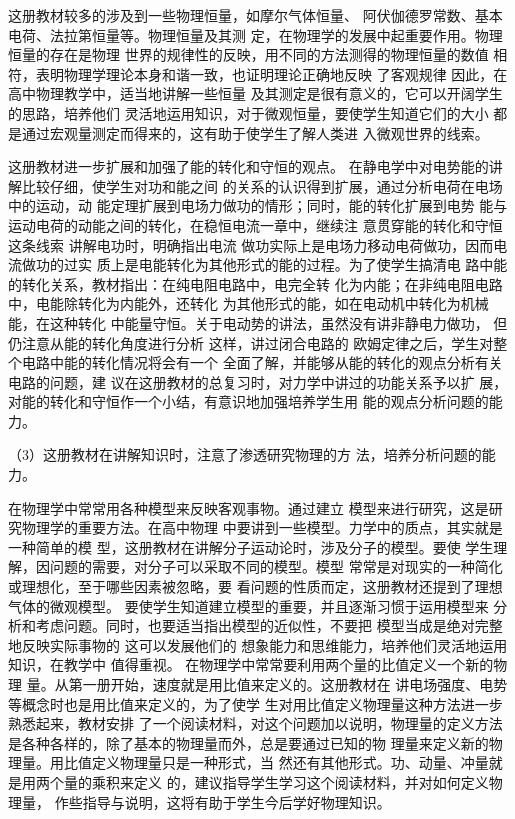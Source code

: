 这册教材较多的涉及到一些物理恒量，如摩尔气体恒量、
阿伏伽德罗常数、基本电荷、法拉第恒量等。物理恒量及其测
定，在物理学的发展中起重要作用。物理恒量的存在是物理
世界的规律性的反映，用不同的方法测得的物理恒量的数值
相符，表明物理学理论本身和谐一致，也证明理论正确地反映
了客观规律 因此，在高中物理教学中，适当地讲解一些恒量
及其测定是很有意义的，它可以开阔学生的思路，培养他们
灵活地运用知识，对于微观恒量，要使学生知道它们的大小
都是通过宏观量测定而得来的，这有助于使学生了解人类进
入微观世界的线索。

这册教材进一步扩展和加强了能的转化和守恒的观点。
在静电学中对电势能的讲解比较仔细，使学生对功和能之间
的关系的认识得到扩展，通过分析电荷在电场中的运动，动
能定理扩展到电场力做功的情形；同时，能的转化扩展到电势
能与运动电荷的动能之间的转化，在稳恒电流一章中，继续注
意贯穿能的转化和守恒这条线索 讲解电功时，明确指出电流
做功实际上是电场力移动电荷做功，因而电流做功的过实
质上是电能转化为其他形式的能的过程。为了使学生搞清电
路中能的转化关系，教材指出：在纯电阻电路中，电完全转
化为内能；在非纯电阻电路中，电能除转化为内能外，还转化
为其他形式的能，如在电动机中转化为机械能，在这种转化
中能量守恒。关于电动势的讲法，虽然没有讲非静电力做功，
但仍注意从能的转化角度进行分析 这样，讲过闭合电路的
欧姆定律之后，学生对整个电路中能的转化情况将会有一个
全面了解，并能够从能的转化的观点分析有关电路的问题，建
议在这册教材的总复习时，对力学中讲过的功能关系予以扩
展，对能的转化和守恒作一个小结，有意识地加强培养学生用
能的观点分析问题的能力。

（3）这册教材在讲解知识时，注意了渗透研究物理的方
法，培养分析问题的能力。

在物理学中常常用各种模型来反映客观事物。通过建立
模型来进行研究，这是研究物理学的重要方法。在高中物理
中要讲到一些模型。力学中的质点，其实就是一种简单的模
型，这册教材在讲解分子运动论时，涉及分子的模型。要使
学生理解，因问题的需要，对分子可以采取不同的模型。模型
常常是对现实的一种简化或理想化，至于哪些因素被忽略，要
看问题的性质而定，这册教材还提到了理想气体的微观模型。
要使学生知道建立模型的重要，并且逐渐习惯于运用模型来
分析和考虑问题。同时，也要适当指出模型的近似性，不要把
模型当成是绝对完整地反映实际事物的 这可以发展他们的
想象能力和思维能力，培养他们灵活地运用知识，在教学中
值得重视。
在物理学中常常要利用两个量的比值定义一个新的物理
量。从第一册开始，速度就是用比值来定义的。这册教材在
讲电场强度、电势等概念时也是用比值来定义的，为了使学
生对用比值定义物理量这种方法进一步熟悉起来，教材安排
了一个阅读材料，对这个问题加以说明，物理量的定义方法
是各种各样的，除了基本的物理量而外，总是要通过已知的物
理量来定义新的物理量。用比值定义物理量只是一种形式，当
然还有其他形式。功、动量、冲量就是用两个量的乘积来定义
的，建议指导学生学习这个阅读材料，并对如何定义物理量，
作些指导与说明，这将有助于学生今后学好物理知识。

